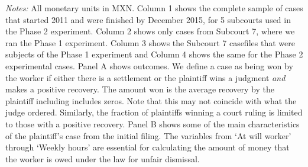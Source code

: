 \documentclass[11pt, a4paper]{article}
\begin{document}
\begin{table}[!ht]
    \caption{Summary Statistics}
    \label{SS_HD}
    \begin{center}
     \scriptsize{}
     \end{center}
\scriptsize
  \textit{Notes:} All monetary units in MXN. Column 1 shows the complete sample of cases that started 2011 and were finished by December 2015, for 5 subcourts used in the Phase 2 experiment. Column 2 shows only cases from Subcourt 7, where we ran the Phase 1 experiment. Column 3 shows the Subcourt 7 casefiles that were subjects of the Phase 1 experiment and Column 4 shows the same for the Phase 2 experimental cases. Panel A shows outcomes. We define a case as being won by the worker if either there is a settlement or the plaintiff wins a judgment \textit{and} makes a positive recovery. The amount won is the average recovery by the plaintiff including includes zeros. Note that this may not coincide with what the judge ordered. Similarly, the fraction of plaintiffs winning a court ruling is limited to those with a positive recovery. Panel B shows some of the main characteristics of the plaintiff's case from the initial filing. The variables from `At will worker' through `Weekly hours' are essential for calculating the amount of money that the worker is owed under the law for unfair dismissal.
\end{table}

\end{document}
